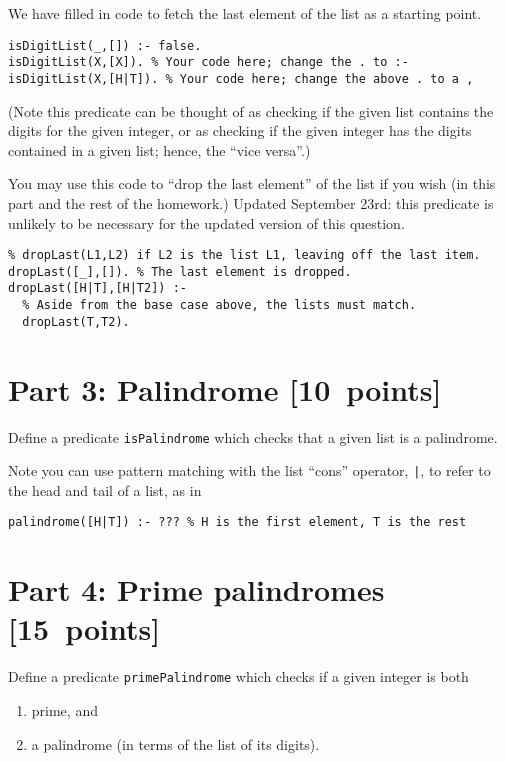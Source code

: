 \documentclass[11pt]{article}
\begin{document}
We have filled in code to fetch the last element of the list
as a starting point.
\begin{verbatim}
isDigitList(_,[]) :- false.
isDigitList(X,[X]). % Your code here; change the . to :-
isDigitList(X,[H|T]). % Your code here; change the above . to a ,
\end{verbatim}

(Note this predicate can be thought of as checking if the given list contains
the digits for the given integer, or as checking if the given integer
has the digits contained in a given list; hence, the “vice versa”.)

You may use this code to “drop the last element” of the list
if you wish (in this part and the rest of the homework.)
Updated September 23rd: this predicate is unlikely to be necessary
for the updated version of this question.
\begin{verbatim}
% dropLast(L1,L2) if L2 is the list L1, leaving off the last item.
dropLast([_],[]). % The last element is dropped.
dropLast([H|T],[H|T2]) :-
  % Aside from the base case above, the lists must match.
  dropLast(T,T2).
\end{verbatim}

\section*{Part 3: Palindrome                                     [10 points]}
\label{sec:org211882e}
Define a predicate \texttt{isPalindrome} which checks that a given
list is a palindrome.

Note you can use pattern matching with the list “cons” operator, \texttt{|},
to refer to the head and tail of a list, as in
\begin{verbatim}
palindrome([H|T]) :- ??? % H is the first element, T is the rest
\end{verbatim}

\section*{Part 4: Prime palindromes                              [15 points]}
\label{sec:org392f969}
Define a predicate \texttt{primePalindrome} which checks
if a given integer is both
\begin{enumerate}
\item prime, and
\item a palindrome (in terms of the list of its digits).
\end{enumerate}
\end{document}

